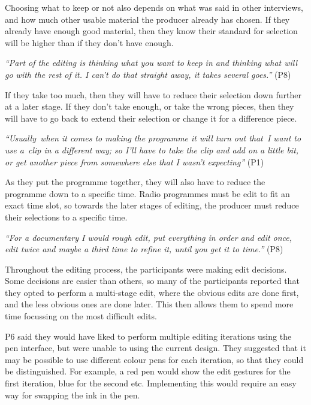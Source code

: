 Choosing what to keep or not also depends on what was said in other interviews, and how much other usable material the
producer already has chosen. If they already have enough good material, then they know their standard for selection
will be higher than if they don't have enough.

\textit{``Part of the editing is thinking what you want to keep in and thinking what will go with the rest of it. I
can't do that straight away, it takes several goes.''} (P8)

If they take too much, then they will have to reduce their selection down further at a later stage. If they don't take
enough, or take the wrong pieces, then they will have to go back to extend their selection or change it for a
difference piece.

\textit{``Usually when it comes to making the programme it will turn out that I want to use a clip in a different way;
  so I'll have to take the clip and add on a little bit, or get another piece from somewhere else that I wasn't
expecting''} (P1)

As they put the programme together, they will also have to reduce the programme down to a specific time. Radio
programmes must be edit to fit an exact time slot, so towards the later stages of editing, the producer must reduce
their selections to a specific time.

\textit{``For a documentary I would rough edit, put everything in order and edit once, edit twice and maybe a third
time to refine it, until you get it to time.''} (P8)

Throughout the editing process, the participants were making edit decisions. Some decisions are easier than others, so
many of the participants reported that they opted to perform a multi-stage edit, where the obvious edits are done
first, and the less obvious ones are done later. This then allows them to spend more time focussing on the most
difficult edits.



P6 said they would have liked to perform multiple editing iterations using the pen interface, but were unable to using
the current design. They suggested that it may be possible to use different colour pens for each iteration, so that
they could be distinguished. For example, a red pen would show the edit gestures for the first iteration, blue for the
second etc. Implementing this would require an easy way for swapping the ink in the pen.

